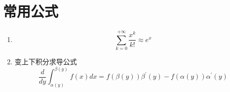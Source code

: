 \section{常用公式}
\begin{enumerate}
	\item 
	\begin{equation}
		\sum_{k=0}^{+\infty}\frac{x^k}{k!} \approx e^x
	\end{equation}

	\item 变上下积分求导公式
	\begin{equation}
		\frac{d}{dy}\int_{\alpha{(y)}}^{\beta{(y)}}f(x)dx = f(\beta(y)){\beta^{'}(y)} - f(\alpha(y)){\alpha^{'}(y)}
	\end{equation}


\end{enumerate}